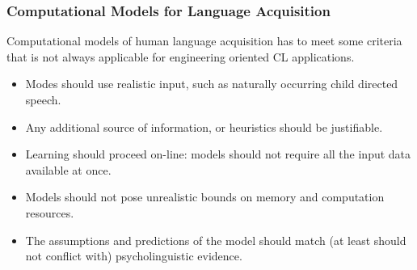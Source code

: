 \begin{frame}
\frametitle{Computational Models for Language Acquisition}
Computational models of human language acquisition has to meet some
criteria that is not always applicable for engineering oriented
CL applications.
\begin{itemize}
\item Modes should use realistic input, such as naturally 
      occurring child directed speech. 
\item Any additional source of information, or heuristics should be
      justifiable.
\item Learning should proceed on-line: models should not require all
      the input data available at once.
\item Models should not pose unrealistic bounds on memory and
      computation resources.
\item The assumptions and predictions of the model should match (at
      least should not conflict with) psycholinguistic evidence.
\end{itemize}
\end{frame}

